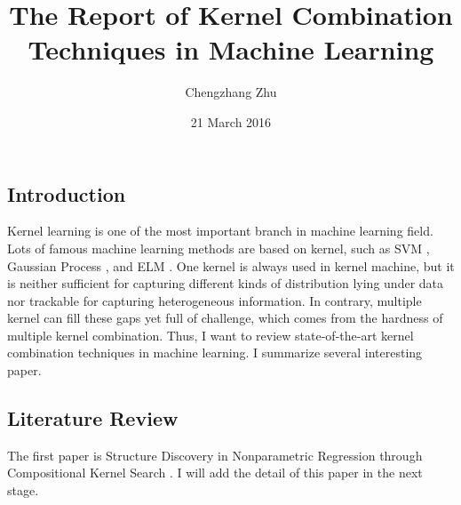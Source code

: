 \documentclass{article}
\title{The Report of Kernel Combination Techniques in Machine Learning}
\author{Chengzhang Zhu}
\date{21 March 2016}
\begin{document}
\maketitle

\subsection*{Introduction}
Kernel learning is one of the most important branch in machine learning field. Lots of famous machine learning methods are based on kernel, such as SVM \cite{vapnik1998statistical}, Gaussian Process \cite{rasmussen2006gaussian}, and ELM \cite{huang2012extreme}. One kernel is always used in kernel machine, but it is neither sufficient for capturing different kinds of distribution lying under data nor trackable for capturing heterogeneous information. In contrary, multiple kernel can fill these gaps yet full of challenge, which comes from the hardness of multiple kernel combination. Thus, I want to review state-of-the-art kernel combination techniques in machine learning. I summarize several interesting paper.

\subsection*{Literature Review}
The first paper is Structure Discovery in Nonparametric Regression through Compositional Kernel Search \cite{duvenaud2013structure}. I will add the detail of this paper in the next stage.
\end{document}
